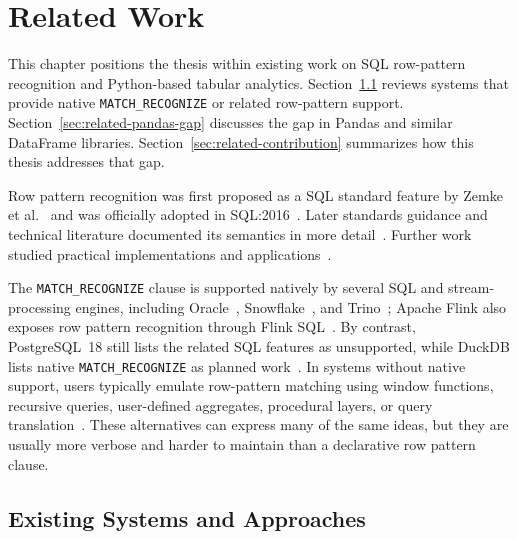 \chapter{Related Work}
\label{chap:related}

This chapter positions the thesis within existing work on SQL
row-pattern recognition and Python-based tabular analytics.
Section~\ref{sec:related-native} reviews systems that provide native
\texttt{MATCH\_RECOGNIZE} or related row-pattern support.
Section~\ref{sec:related-pandas-gap} discusses the gap in Pandas and
similar DataFrame libraries.  Section~\ref{sec:related-contribution}
summarizes how this thesis addresses that gap.

Row pattern recognition was first proposed as a SQL standard feature
by Zemke et al.~\cite{zemke2007pattern} and was officially adopted
in SQL:2016~\cite{ISO2016SQL,iso2016}.
Later standards guidance and technical literature documented its
semantics in more detail~\cite{ISO2021,melton2017sqlrpr,
michels2018new}.  Further work studied practical implementations and
applications~\cite{petkovic2022rpr,petkovic2022fraud}.

The \texttt{MATCH\_RECOGNIZE} clause is supported natively by
several SQL and stream-processing engines, including
Oracle~\cite{OracleMR,oracle2021dwhsg,book,oracle2022},
Snowflake~\cite{snowflake2025match_recognize}, and
Trino~\cite{trino2022,trino2021row}; Apache Flink also exposes row
pattern recognition through Flink SQL~\cite{flink}.
By contrast, PostgreSQL~18 still lists the related SQL features as
unsupported, while DuckDB lists native \texttt{MATCH\_RECOGNIZE} as
planned work~\cite{postgresql18unsupported,duckdb2026roadmap,howe2020matchrecognize,findling2025bringing}.
In systems without native support, users typically emulate
row-pattern matching using window functions, recursive queries,
user-defined aggregates, procedural layers, or query
translation~\cite{TURP2,TURP,cao2012optimizationanalyticwindowfunctions,
lambrecht2025democratize}.
These alternatives can express many of the same ideas, but they are
usually more verbose and harder to maintain than a declarative row
pattern clause.

\section{Existing Systems and Approaches}
\label{sec:related-native}

